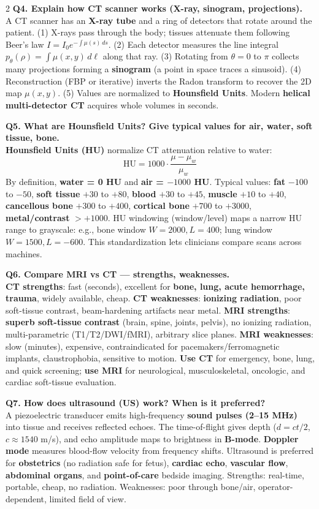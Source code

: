 \begin{paracol}{2}
\textbf{Q4. Explain how CT scanner works (X-ray, sinogram, projections).}\\
A CT scanner has an \textbf{X-ray tube} and a ring of detectors that rotate around the patient. (1) X-rays pass through the body; tissues attenuate them following Beer's law $I = I_0 e^{-\int \mu(s)\,ds}$. (2) Each detector measures the line integral $p_\theta(\rho) = \int \mu(x,y)\,d\ell$ along that ray. (3) Rotating from $\theta=0$ to $\pi$ collects many projections forming a \textbf{sinogram} (a point in space traces a sinusoid). (4) Reconstruction (FBP or iterative) inverts the Radon transform to recover the 2D map $\mu(x,y)$. (5) Values are normalized to \textbf{Hounsfield Units}. Modern \textbf{helical multi-detector CT} acquires whole volumes in seconds.

\textbf{Q5. What are Hounsfield Units? Give typical values for air, water, soft tissue, bone.}\\
\textbf{Hounsfield Units (HU)} normalize CT attenuation relative to water:
$$\mathrm{HU} = 1000 \cdot \frac{\mu - \mu_w}{\mu_w}$$
By definition, \textbf{water = 0 HU} and \textbf{air = $-1000$ HU}. Typical values: \textbf{fat} $-100$ to $-50$, \textbf{soft tissue} $+30$ to $+80$, \textbf{blood} $+30$ to $+45$, \textbf{muscle} $+10$ to $+40$, \textbf{cancellous bone} $+300$ to $+400$, \textbf{cortical bone} $+700$ to $+3000$, \textbf{metal/contrast} $> +1000$. HU windowing (window/level) maps a narrow HU range to grayscale: e.g., bone window $W=2000, L=400$; lung window $W=1500, L=-600$. This standardization lets clinicians compare scans across machines.

\textbf{Q6. Compare MRI vs CT --- strengths, weaknesses.}\\
\textbf{CT strengths}: fast (seconds), excellent for \textbf{bone, lung, acute hemorrhage, trauma}, widely available, cheap. \textbf{CT weaknesses}: \textbf{ionizing radiation}, poor soft-tissue contrast, beam-hardening artifacts near metal. \textbf{MRI strengths}: \textbf{superb soft-tissue contrast} (brain, spine, joints, pelvis), no ionizing radiation, multi-parametric (T1/T2/DWI/fMRI), arbitrary slice planes. \textbf{MRI weaknesses}: slow (minutes), expensive, contraindicated for pacemakers/ferromagnetic implants, claustrophobia, sensitive to motion. \textbf{Use CT} for emergency, bone, lung, and quick screening; \textbf{use MRI} for neurological, musculoskeletal, oncologic, and cardiac soft-tissue evaluation.

\textbf{Q7. How does ultrasound (US) work? When is it preferred?}\\
A piezoelectric transducer emits high-frequency \textbf{sound pulses (2--15 MHz)} into tissue and receives reflected echoes. The time-of-flight gives depth ($d = ct/2$, $c \approx 1540$ m/s), and echo amplitude maps to brightness in \textbf{B-mode}. \textbf{Doppler mode} measures blood-flow velocity from frequency shifts. Ultrasound is preferred for \textbf{obstetrics} (no radiation safe for fetus), \textbf{cardiac echo}, \textbf{vascular flow}, \textbf{abdominal organs}, and \textbf{point-of-care} bedside imaging. Strengths: real-time, portable, cheap, no radiation. Weaknesses: poor through bone/air, operator-dependent, limited field of view.


\end{paracol}
